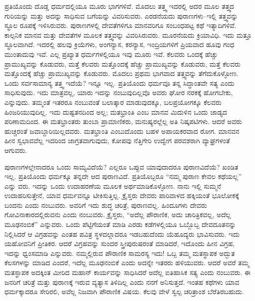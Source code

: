 \vskip 0.2cm

ಪ್ರತಿಯೊಂದು ದೊಡ್ಡ ಧರ್ಮದಲ್ಲಿಯೂ ಮೂರು ಭಾಗಗಳಿವೆ. ಮೊದಲು ತತ್ತ್ವ ಇದರಲ್ಲಿ ಅದರ ಮೂಲ ತತ್ತ್ವದ ಗುರಿಯನ್ನು ಮತ್ತು ಅದನ್ನು ಸಾಧಿಸುವ ಬಗೆಯನ್ನು ವಿವರಿಸುವರು. ಎರಡನೆಯದು ಪುರಾಣಗಳು–ಇಲ್ಲಿ ತತ್ತ್ವವನ್ನು ಸ್ಥೂಲ ರೂಪಕ್ಕೆ ಇಳಿಸಿರುವರು. ಪುರಾಣಗಳಲ್ಲಿ ದೇವತೆಗಳಿಗೂ ಮಾನವರಿಗೂ ಸಂಬಂಧಪಟ್ಟ ಕಥೆ ಇತ್ಯಾದಿಗಳಿವೆ. ಕಾಲ್ಪನಿಕ ಮಾನವ ಮತ್ತು ದೇವತೆಗಳ ಮೂಲಕ ತತ್ತ್ವವನ್ನು ವಿವರಿಸಿರುವರು. ಮೂರನೆಯದು ಕ್ರಿಯಾವಿಧಿ. ಇದು ಮತ್ತೂ ಸ್ಥೂಲವಾಗಿದೆ. ಇದರಲ್ಲಿ ಹಲವು ಕ್ರಿಯೆಗಳು, ಅಂಗನ್ಯಾಸ, ಕರನ್ಯಾಸ, ಇಂದ್ರಿಯಗಳಿಗೆ ಪ್ರಿಯವಾದ ಹೂವು ಗಂಧ ಮುಂತಾದುವು ಇವೆ. ಎಲ್ಲ ಪ್ರಖ್ಯಾತ ಧರ್ಮಗಳಲ್ಲಿಯೂ ಇವು ಮೂರು ಇವೆ. ಕೆಲವರು ಒಂದಕ್ಕೆ ಹೆಚ್ಚು ಪ್ರಾಮುಖ್ಯವನ್ನು ಕೊಡುವರು, ಮತ್ತೆ ಕೆಲವರು ಮತ್ತೊಂದಕ್ಕೆ ಹೆಚ್ಚು ಪ್ರಾಮುಖ್ಯವನ್ನು ಕೊಡುವರು, ಮತ್ತೆ ಕೆಲವರು ಮತ್ತೊಂದಕ್ಕೆ ಹೆಚ್ಚು ಪ್ರಾಮುಖ್ಯವನ್ನು ಕೊಡುವರು. ಮೊದಲು ಪ್ರಥಮ ಭಾಗವಾದ ತತ್ತ್ವವನ್ನು ತೆಗೆದುಕೊಳ್ಳೋಣ. ಒಂದು ಸರ್ವಸಾಮಾನ್ಯ ತತ್ತ್ವ ಇದೆಯೆ? ಇನ್ನೂ ಇಲ್ಲ. ಪ್ರತಿಯೊಂದು ಧರ್ಮವೂ ತನ್ನ ಸಿದ್ಧಾಂತವೇ ಸತ್ಯ ಎಂದು ಸಾಧಿಸುವುದು. ಇದು ಮಾತ್ರವಲ್ಲ, ಯಾರು ಇದನ್ನು ನಂಬುವುದಿಲ್ಲವೊ ಅವರು ಘೋರ ನರಕಕ್ಕೆ ಹೋಗಬೇಕು, ಎನ್ನುವುದು. ತಮ್ಮಂತೆ ಇತರರೂ ನಂಬುವಂತೆ ಬಲಾತ್ಕಾರ ಮಾಡುವುದಕ್ಕೂ, ಬಲಪ್ರಯೋಗಕ್ಕೂ ಕೆಲವರು ಹಿಂಜರಿಯುವುದಿಲ್ಲ. ಇದು ದುಷ್ಟತನದಿಂದ ಅಲ್ಲ; ಮತಭ್ರಾಂತಿ ಎಂಬ ಮಾನವ ಮಿದುಳಿನ ಒಂದು ಜಾಡ್ಯದ ಪರಿಣಾಮದಿಂದ. ಈ ಮತಭ್ರಾಂತರು ತುಂಬಾ ಪ್ರಾಮಾಣಿಕರು, ಮನುಷ್ಯರಲ್ಲೆಲ್ಲ ಅತಿ ನಿಷ್ಕಪಟಿಗಳು. ಆದರೆ ಅವರು ಹುಚ್ಚರಂತೆ ಜವಾಬ್ದಾರಿಯಿಲ್ಲದವರು. ಮತಭ್ರಾಂತಿ ಎಂಬುದೊಂದು ಬಹಳ ಅಪಾಯಕರವಾದ ರೋಗ. ಮಾನವನ ಹೀನ ಸ್ವಭಾವವೆಲ್ಲ ಇದರಿಂದ ಜಾಗ್ರತವಾಗುವುದು, ಕೋಪವು ನೆತ್ತಿಗೇರಿ ಉದ್ವೇಗ ಪರವಶರಾಗಿ ವ್ಯಾಘ್ರಗಳಂತೆ ಆಗುವರು.

\vskip 0.2cm

ಪುರಾಣಗಳಲ್ಲೇನಾದರೂ ಒಂದು ಸಾಮ್ಯವಿದೆಯೆ? ಎಲ್ಲರೂ ಒಪ್ಪುವ ಯಾವುದಾದರೂ ಪುರಾಣವಿದೆಯೆ? ಖಂಡಿತ ಇಲ್ಲ. ಪ್ರತಿಯೊಂದು ಧರ್ಮಕ್ಕೂ ತನ್ನದೇ ಆದ ಪುರಾಣವಿದೆ. ಪ್ರತಿಯೊಬ್ಬರೂ “ನಮ್ಮ ಪುರಾಣ ಕೇವಲ ಕಥೆಯಲ್ಲ” ಎನ್ನು ವರು. ಇದನ್ನು ಒಂದು ಉದಾಹರಣೆಯ ಮೂಲಕ ಅರ್ಥಮಾಡಿಕೊಳ್ಳೋಣ. ನಾನು ಇಲ್ಲಿ ಸುಮ್ಮನೆ ಉದಾಹರಿಸುತ್ತೇನೆ, ಯಾವ ಧರ್ಮವನ್ನೂ ಟೀಕಿಸುತ್ತಿಲ್ಲ. ಕ್ರೈಸ್ತರು ದೇವರು ಪಾರಿವಾಳದ ಹಕ್ಕಿಯಂತೆ ಭೂಲೋಕಕ್ಕೆ ಬಂದನು ಎಂದು ನಂಬುವರು. ಅವರಿಗೆ ಇದು ಶುದ್ಧ ಚರಿತ್ರೆ, ಪುರಾಣವಲ್ಲ. ಹಿಂದೂಗಳು ದೇವರು ಗೋವಿನಾಕಾರದಲ್ಲಿರುವನು ಎಂದು ನಂಬುವರು. ಕ್ರೈಸ್ತರು, “ಅದೆಲ್ಲ ಪೌರಾಣಿಕ, ಅದು ಚಾರಿತ್ರಿಕವಲ್ಲ, ಅದೆಲ್ಲ ಮೂಢನಂಬಿಕೆ” ಎನ್ನುವರು. ಒಂದು ಪೆಟ್ಟಿಗೆಯಂತೆ ಮಾಡಿ ಎರಡು ಕಡೆಗಳಲ್ಲಿಯೂ ಒಬ್ಬೊಬ್ಬ ದೇವದೂತನನ್ನು ನಿಲ್ಲಿಸಿದರೆ ಆ ವಿಗ್ರಹವನ್ನು ಎಂತಹ ಪವಿತ್ರ ಸ್ಥಳದಲ್ಲಾದರೂ ಇಡಬಹುದೆಂದು ಯೆಹೂದ್ಯರು ಭಾವಿಸುವರು. ಇದು ಯಹೋವನಿಗೆ ಪ್ರೀತಿಕರ. ಆದರೆ ವಿಗ್ರಹವನ್ನು ಸುಂದರ ಸ್ತ್ರೀಪುರುಷರಂತೆ ಮಾಡಿದರೆ, ಇದೊಂದು ಹೀನ ವಿಗ್ರಹ, ಇದನ್ನು ಧ್ವಂಸಮಾಡಿ ಎನ್ನುವರು. ನಮ್ಮಲ್ಲಿರುವ ಪೌರಾಣಿಕ ಸಾಮರಸ್ಯ ಇದು! ಒಬ್ಬ ತಮ್ಮ ಮತಸ್ಥಾಪಕ ಅದ್ಭುತ ಕೆಲಸಗಳನ್ನು ಮಾಡಿದ ಎಂದರೆ, ಇದೆಲ್ಲ ಮೂಢನಂಬಿಕೆ ಎಂದು ಅದನ್ನೇ ಇತರರು ಹಳಿಯುವರು. ಆದರೆ ಅವರೆ ತಮ್ಮ ಮತಸ್ಥಾಪಕ ಅದಕ್ಕಿಂತ ಮೀರಿದ ಮಹಾನ್​ ಕಾರ್ಯವನ್ನು ಸಾಧಿಸಿದರೆ ಅದೆಲ್ಲ ಐತಿಹಾಸಿಕ ಸತ್ಯ ಎಂದು ನಂಬುವರು. ಈ ಜನರಿಗೆ ಚರಿತ್ರೆ ಮತ್ತು ಪುರಾಣಕ್ಕೆ ಇರುವ ವ್ಯತ್ಯಾಸ ತಿಳಿದಿಲ್ಲ ಎಂದು ನನಗೆ ಅನಿಸುತ್ತದೆ. ಇಂತಹ ಕಥೆಗಳು ಯಾವ ಧರ್ಮಕ್ಕಾದರೂ ಸೇರಿರಲಿ, ಅವೆಲ್ಲ ನಿಜವಾಗಿ ಪೌರಾಣಿಕ ವಿಷಯ. ಕೆಲವು ವೇಳೆ ಸ್ವಲ್ಪ ಚರಿತ್ರಾಂಶ ಬೆರೆತಿರಬಹುದು.

